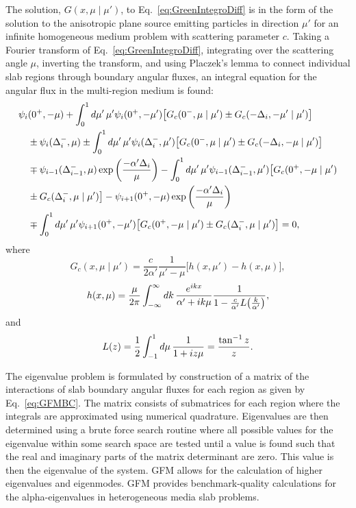 The solution, $G(x,\mu \mid \mu')$, to Eq.~\ref{eq:GreenIntegroDiff} is in the form of the solution to the anisotropic plane source emitting particles in direction $\mu'$ for an infinite homogeneous medium problem with scattering parameter $c$. Taking a Fourier transform of Eq.~\ref{eq:GreenIntegroDiff}, integrating over the scattering angle $\mu$, inverting the transform, and using Placzek's lemma to connect individual slab regions through boundary angular fluxes, an integral equation for the angular flux in the multi-region medium is found:
\begin{align}
\begin{split}
	\psi_{i}&(0^{+}, -\mu) + \int_{0}^{1} \mathop{}\!d \mu' \, \mu' \psi_{i}(0^{+}, - \mu') \big [ G_{c}(0^{-}, \mu \mid \mu') \pm G_{c}(-\Delta_{i}, -\mu' \mid \mu') \big ] \\
	&\pm \psi_{i}(\Delta_{i}^{-},\mu) \pm \int_{0}^{1} \mathop{}\!d \mu' \, \mu' \psi_{i}(\Delta_{i}^{-}, \mu') \big [ G_{c}(0^{-}, \mu \mid \mu') \pm G_{c}(-\Delta_{i}, -\mu \mid \mu') \big ] \\
	&\mp \psi_{i-1}(\Delta_{i-1}^{-}, \mu) \exp \bigg ( \frac{-\alpha' \Delta_{i}}{\mu} \bigg ) - \int_{0}^{1} \mathop{}\!d \mu' \, \mu' \psi_{i-1}(\Delta_{i-1}^{-}, \mu') \big [ G_{c}(0^{+}, -\mu \mid \mu') \\
	&\pm G_{c}(\Delta_{i}^{-}, \mu \mid \mu') \big ] - \psi_{i+1}(0^{+}, -\mu) \exp \bigg ( \frac{-\alpha' \Delta_{i}}{\mu} \bigg ) \\
	&\mp \int_{0}^{1} \mathop{}\!d \mu' \, \mu' \psi_{i+1}(0^{+}, -\mu') \big [ G_{c}(0^{+}, -\mu \mid \mu') \pm G_{c}(\Delta_{i}^{-}, \mu \mid \mu') \big ] = 0,
\end{split}
\label{eq:GFMBC}
\end{align}
where
\begin{equation}
	G_{c}(x, \mu \mid \mu') = \frac{c}{2\alpha'} \frac{1}{\mu' - \mu} \big [ h(x,\mu') - h(x,\mu) \big ],
\end{equation}
\begin{equation}
	h(x,\mu) = \frac{\mu}{2\pi} \int_{-\infty}^{\infty} \mathop{}\!d k \, \frac{e^{ikx}}{\alpha' + i k \mu} \frac{1}{1 - \frac{c}{\alpha'} L \big ( \frac{k}{\alpha'} \big ) },
\end{equation}
and
\begin{equation}
	L(z) = \frac{1}{2} \int_{-1}^{1} \mathop{}\!d \mu \, \frac{1}{1 + i z \mu} = \frac{\tan^{-1} z}{z}.
\end{equation}

The eigenvalue problem is formulated by construction of a matrix of the interactions of slab boundary angular fluxes for each region as given by Eq.~\ref{eq:GFMBC}. The matrix consists of submatrices for each region where the integrals are approximated using numerical quadrature. Eigenvalues are then determined using a brute force search routine where all possible values for the eigenvalue within some search space are tested until a value is found such that the real and imaginary parts of the matrix determinant are zero. This value is then the eigenvalue of the system. GFM allows for the calculation of higher eigenvalues and eigenmodes. GFM provides benchmark-quality calculations for the alpha-eigenvalues in heterogeneous media slab problems.

